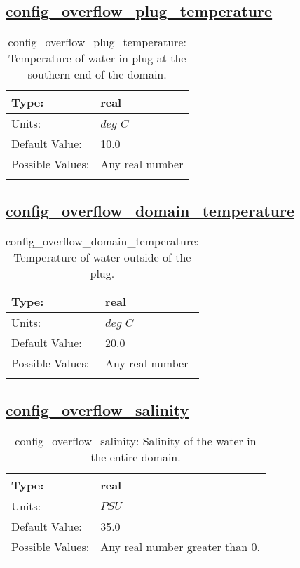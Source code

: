 \subsection[config\_overflow\_plug\_temperature]{\hyperref[sec:nm_tab_overflow]{config\_overflow\_plug\_temperature}}
\label{subsec:nm_sec_config_overflow_plug_temperature}
\begin{center}
\begin{longtable}{| p{2.0in} || p{4.0in} |}
    \hline
    Type: & real \\
    \hline
    Units: & $deg$ $C$ \\
    \hline
    Default Value: & 10.0 \\
    \hline
    Possible Values: & Any real number \\
    \hline
    \caption{config\_overflow\_plug\_temperature: Temperature of water in plug at the southern end of the domain.}
\end{longtable}
\end{center}
\subsection[config\_overflow\_domain\_temperature]{\hyperref[sec:nm_tab_overflow]{config\_overflow\_domain\_temperature}}
\label{subsec:nm_sec_config_overflow_domain_temperature}
\begin{center}
\begin{longtable}{| p{2.0in} || p{4.0in} |}
    \hline
    Type: & real \\
    \hline
    Units: & $deg$ $C$ \\
    \hline
    Default Value: & 20.0 \\
    \hline
    Possible Values: & Any real number \\
    \hline
    \caption{config\_overflow\_domain\_temperature: Temperature of water outside of the plug.}
\end{longtable}
\end{center}
\subsection[config\_overflow\_salinity]{\hyperref[sec:nm_tab_overflow]{config\_overflow\_salinity}}
\label{subsec:nm_sec_config_overflow_salinity}
\begin{center}
\begin{longtable}{| p{2.0in} || p{4.0in} |}
    \hline
    Type: & real \\
    \hline
    Units: & $PSU$ \\
    \hline
    Default Value: & 35.0 \\
    \hline
    Possible Values: & Any real number greater than 0. \\
    \hline
    \caption{config\_overflow\_salinity: Salinity of the water in the entire domain.}
\end{longtable}
\end{center}
